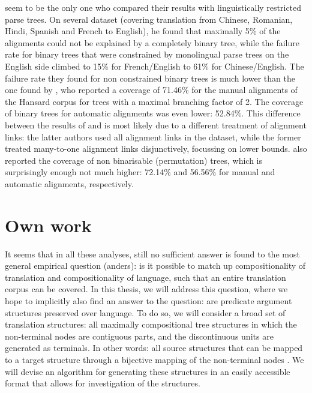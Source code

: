 \documentclass{report}
\theoremstyle{break}
\begin{document}
\cite{wellington2006empirical} seem to be the only one who compared their results with linguistically restricted parse trees. On several dataset (covering translation from Chinese, Romanian, Hindi, Spanish and French to English), he found that maximally 5\% of the alignments could not be explained by a completely binary tree, while the failure rate for binary trees that were constrained by monolingual parse trees on the English side climbed to 15\% for French/English to 61\% for Chinese/English. The failure rate they found for non constrained binary trees is much lower than the one found by \cite{simaan2013hats}, who reported a coverage of 71.46\% for the manual alignments of the Hansard corpus for trees with a maximal branching factor of 2. The coverage of binary trees for automatic alignments was even lower: 52.84\%. This difference between the results of \cite{wellington2006empirical} and \cite{simaan2013hats} is most likely due to a different treatment of alignment links: the latter authors used all alignment links in the dataset, while the former treated many-to-one alignment links disjunctively, focussing on lower bounds. \cite{simaan2013hats} also reported the coverage of non binarisable (permutation) trees, which is surprisingly enough not much higher: 72.14\% and 56.56\% for manual and automatic alignments, respectively.







\chapter{Own work}

It seems that in all these analyses, still no sufficient answer is found to the most general empirical question (anders): is it possible to match up compositionality of translation and compositionality of language, such that an entire translation corpus can be covered. In this thesis, we will address this question, where we hope to implicitly also find an answer to the question: are predicate argument structures preserved over language. To do so, we will consider a broad set of translation structures: all maximally compositional tree structures in which the non-terminal nodes are contiguous parts, and the discontinuous units are generated as terminals. In other words: all source structures that can be mapped to a target structure through a bijective mapping of the non-terminal nodes \citep[this set was previously defined in][]{simaan2013hats}. We will devise an algorithm for generating these structures in an easily accessible format that allows for investigation of the structures.
\end{document}
